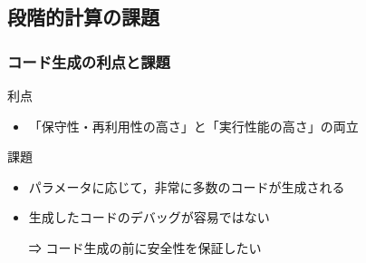 

\subsection{段階的計算の課題}

\begin{frame}
  \frametitle{コード生成の利点と課題}
  利点
  \begin{itemize}
  \item \alert{「保守性・再利用性の高さ」}と\alert{「実行性能の高さ」}の両立
  \end{itemize}

  \pause

  課題
  \begin{itemize}
  \item パラメータに応じて，非常に多数のコードが生成される
  \item 生成したコードのデバッグが容易ではない
  \item [⇒] \alert{コード生成の前に安全性を保証}したい
  \end{itemize}
\end{frame}

